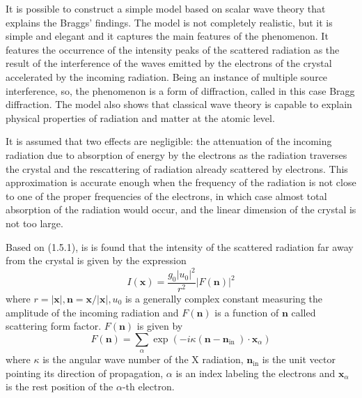 \documentclass{article}
\begin{document}
It is possible to construct a simple model based on scalar wave theory that explains the Braggs' findings. The model is not completely realistic, but it is simple and elegant and it captures the main features of the phenomenon. It features the occurrence of the intensity peaks of the scattered radiation as the result of the interference of the waves emitted by the electrons of the crystal accelerated by the incoming radiation. Being an instance of multiple source interference, so, the phenomenon is a form of diffraction, called in this case Bragg diffraction. The model also shows that classical wave theory is capable to explain physical properties of radiation and matter at the atomic level.

It is assumed that two effects are negligible: the attenuation of the incoming radiation due to absorption of energy by the electrons as the radiation traverses the crystal and the rescattering of radiation already scattered by electrons. This approximation is accurate enough when the frequency of the radiation is not
close to one of the proper frequencies of the electrons, in which case almost total absorption of the radiation would occur, and the linear dimension of the crystal is not too large.

Based on (1.5.1), is is found that the intensity of the scattered radiation far away from the crystal is given by the expression
$$
\begin{equation*}
I(\boldsymbol{x})=\frac{g_{0}\left|u_{0}\right|^{2}}{r^{2}}|F(\boldsymbol{n})|^{2} \tag{1.8.1}
\end{equation*}
$$
where $r=|\boldsymbol{x}|, \boldsymbol{n}=\boldsymbol{x} /|\boldsymbol{x}|, u_{0}$ is a generally complex constant measuring the amplitude of the incoming radiation and $F(\boldsymbol{n})$ is a function of $\boldsymbol{n}$ called scattering form factor. $F(\boldsymbol{n})$ is given by
$$
\begin{equation*}
F(\boldsymbol{n})=\sum_{\alpha} \exp \left(-i \kappa\left(\boldsymbol{n}-\boldsymbol{n}_{\text {in }}\right) \cdot \boldsymbol{x}_{\alpha}\right) \tag{1.8.2}
\end{equation*}
$$
where $\kappa$ is the angular wave number of the X radiation, $\boldsymbol{n}_{\mathrm{in}}$ is the unit vector pointing its direction of propagation, $\alpha$ is an index labeling the electrons and $\boldsymbol{x}_{\alpha}$ is the rest position of the $\alpha$-th electron.
\end{document}
